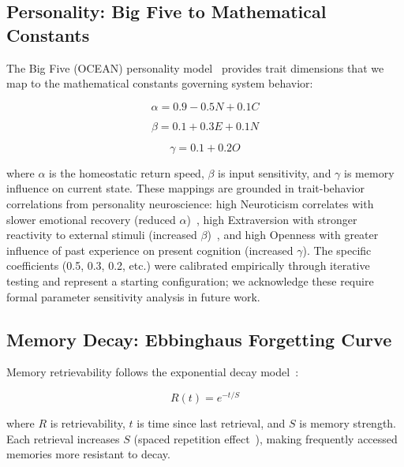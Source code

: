 \documentclass[journal,twoside]{IEEEtran}
\begin{document}
\subsection{Personality: Big Five to Mathematical Constants}

The Big Five (OCEAN) personality model~\cite{costa1992} provides trait dimensions that we map to the mathematical constants governing system behavior:

\begin{equation}
\alpha = 0.9 - 0.5N + 0.1C
\label{eq:alpha}
\end{equation}

\begin{equation}
\beta = 0.1 + 0.3E + 0.1N
\label{eq:beta}
\end{equation}

\begin{equation}
\gamma = 0.1 + 0.2O
\label{eq:gamma}
\end{equation}

where $\alpha$ is the homeostatic return speed, $\beta$ is input sensitivity, and $\gamma$ is memory influence on current state. These mappings are grounded in trait-behavior correlations from personality neuroscience: high Neuroticism correlates with slower emotional recovery (reduced $\alpha$)~\cite{costa1992, williams2020}, high Extraversion with stronger reactivity to external stimuli (increased $\beta$)~\cite{costa1992}, and high Openness with greater influence of past experience on present cognition (increased $\gamma$). The specific coefficients (0.5, 0.3, 0.2, etc.) were calibrated empirically through iterative testing and represent a starting configuration; we acknowledge these require formal parameter sensitivity analysis in future work.

\subsection{Memory Decay: Ebbinghaus Forgetting Curve}

Memory retrievability follows the exponential decay model~\cite{ebbinghaus1885, wixted2020}:

\begin{equation}
R(t) = e^{-t/S}
\label{eq:ebbinghaus}
\end{equation}

where $R$ is retrievability, $t$ is time since last retrieval, and $S$ is memory strength. Each retrieval increases $S$ (spaced repetition effect~\cite{roediger2006}), making frequently accessed memories more resistant to decay.
\end{document}
